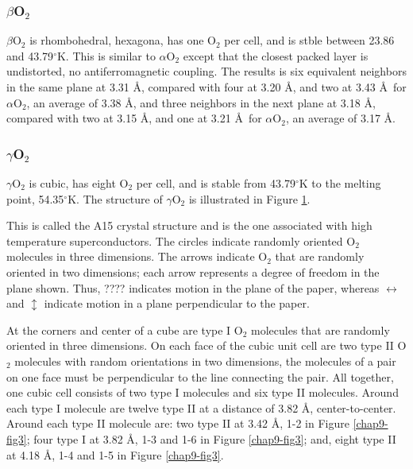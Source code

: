 \subsubsection{$\beta$O$_2$}

$\beta$O$_2$ is rhombohedral, hexagona, has one O$_2$ per cell, and is 
stble between 23.86 and 43.79$^{\circ}$K.  This is similar to 
$\alpha$O$_2$ except that the closest packed layer is undistorted, no 
antiferromagnetic coupling.  The results is six equivalent neighbors 
in the same plane at 3.31 \AA, compared with four at 3.20 \AA, and two 
at 3.43 \AA\ for $\alpha$O$_2$, an average of 3.38 \AA, and three 
neighbors in the next plane at 3.18 \AA, compared with two at 3.15 
\AA, and one at 3.21 \AA\ for $\alpha$O$_2$, an average of 3.17 \AA.

\subsubsection{$\gamma$O$_2$}

$\gamma$O$_2$ is cubic, has eight O$_2$ per cell, and is stable from 
43.79$^{\circ}$K to the melting point, 54.35$^{\circ}$K.  The 
structure of $\gamma$O$_2$ is illustrated in Figure \ref{chap9-fig17}.

\begin{figure}
\caption{}
\label{chap9-fig17}
\end{figure}

This is called the A15 crystal structure and is the one associated
with high temperature superconductors.  The circles indicate randomly
oriented O$_2$ molecules in three dimensions. The arrows indicate
O$_2$ that are randomly oriented in two dimensions; each arrow
represents a degree of freedom in the plane shown. Thus, ????
indicates motion in the plane of the paper, whereas $\leftrightarrow$
and $\updownarrow$ indicate motion in a plane perpendicular to the
paper.

At the corners and center of a cube are type I O$_2$ molecules that
are randomly oriented in three dimensions.  On each face of the cubic
unit cell are two type II O$_2$ molecules with random orientations in
two dimensions, the molecules of a pair on one face must be
perpendicular to the line connecting the pair.  All together, one
cubic cell consists of two type I molecules and six type II molecules.
Around each type I molecule are twelve type II at a distance of 3.82
\AA, center-to-center.  Around each type II molecule are: two type II
at 3.42 \AA, 1-2 in Figure \ref{chap9-fig3}; four type I at 3.82 \AA,
1-3 and 1-6 in Figure \ref{chap9-fig3}; and, eight type II at 4.18
\AA, 1-4 and 1-5 in Figure \ref{chap9-fig3}.

